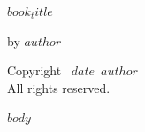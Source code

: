 \documentclass[12pt]{memoir}
\def\booktitle{$book_title$}
\def\bookauthor{$author$}
\def\bookdate{$date$}
\begin{document}
\thispagestyle{empty}
\begin{center}
\begin{minipage}{\textheight}
\vfill
\vspace{2in}
{\Huge\scshape\booktitle\par}
\vspace{0.5in}
{\LARGE by \bookauthor\par}
\vspace{2in}
\vfill
\end{minipage}
\end{center}

\clearpage
\thispagestyle{empty}
\vspace*{\fill}
\begin{center}
Copyright \textcopyright\ \bookdate\ \bookauthor\\
All rights reserved.
\end{center}
\vspace*{\fill}

\clearpage
\tableofcontents

$body$
\end{document}
